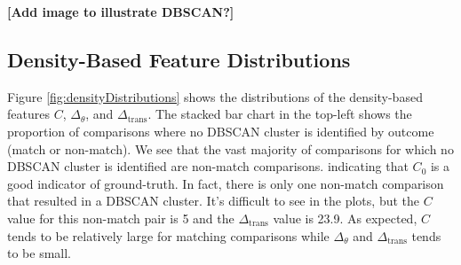 \documentclass[11pt,]{isuthesis}
\begin{document}
\textbf{{[}Add image to illustrate DBSCAN?{]}}

\hypertarget{density-based-feature-distributions}{%
\subsection{Density-Based Feature Distributions}\label{density-based-feature-distributions}}

Figure \ref{fig:densityDistributions} shows the distributions of the density-based features \(C\), \(\Delta_\theta\), and \(\Delta_{\text{trans}}\).
The stacked bar chart in the top-left shows the proportion of comparisons where no DBSCAN cluster is identified by outcome (match or non-match).
We see that the vast majority of comparisons for which no DBSCAN cluster is identified are non-match comparisons. indicating that \(C_0\) is a good indicator of ground-truth.
In fact, there is only one non-match comparison that resulted in a DBSCAN cluster.
It's difficult to see in the plots, but the \(C\) value for this non-match pair is 5 and the \(\Delta_{\text{trans}}\) value is 23.9.
As expected, \(C\) tends to be relatively large for matching comparisons while \(\Delta_{\theta}\) and \(\Delta_{\text{trans}}\) tends to be small.
\end{document}
